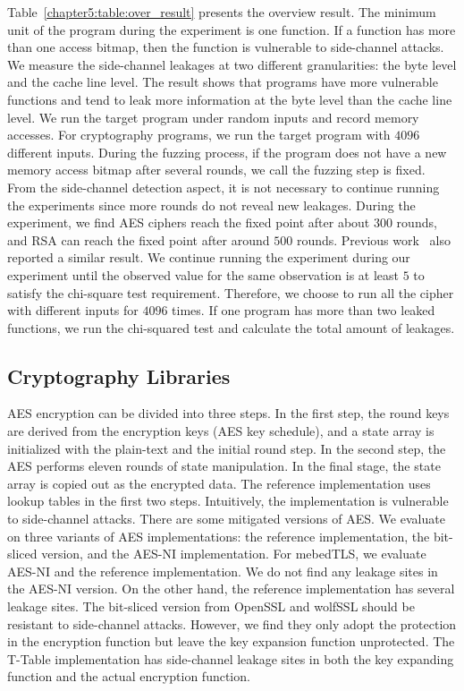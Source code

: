 Table~\ref{chapter5:table:over_result} presents the overview result. The minimum unit of the program during the experiment is one function. If a function has more than one access bitmap, then the function is vulnerable to side-channel attacks. We measure the side-channel leakages at two different granularities: the byte level and the cache line level. The result shows that programs have more vulnerable functions and tend to leak more information at the byte level than the cache line level. We run the target program under random inputs and record memory accesses. For cryptography programs, we run the target program with $4096$ different inputs. During the fuzzing process, if the program does not have a new memory access bitmap after several rounds, we call the fuzzing step is fixed. From the side-channel detection aspect, it is not necessary to continue running the experiments since more rounds do not reveal new leakages. During the experiment, we find AES ciphers reach the fixed point after about $300$ rounds, and RSA can reach the fixed point after around $500$ rounds. Previous work~\cite{217537} also reported a similar result. We continue running the experiment during our experiment until the observed value for the same observation is at least $5$ to satisfy the chi-square test requirement. Therefore, we choose to run all the cipher with different inputs for $4096$ times.  If one program has more than two leaked functions, we run the chi-squared test and calculate the total amount of leakages.




\subsection{Cryptography Libraries}
AES encryption can be divided into three steps. In the first step, the round keys are derived from the encryption keys (AES key schedule), and a state array is initialized with the plain-text and the initial round step. In the second step, the AES performs eleven rounds of state manipulation. In the final stage, the state array is copied out as the encrypted data.
The reference implementation uses lookup tables in the first two steps. Intuitively, the implementation is vulnerable to side-channel attacks. There are some mitigated versions of AES. We evaluate \ctool{} on three variants of AES implementations: the reference implementation, the bit-sliced version, and the AES-NI implementation.
For mebedTLS, we evaluate AES-NI and the reference implementation. We do not find any leakage sites in the AES-NI version. On the other hand, the reference implementation has several leakage sites. The bit-sliced version from OpenSSL and wolfSSL should be resistant to side-channel attacks. However, we find they only adopt the protection in the encryption function but leave the key expansion function unprotected. The T-Table implementation has side-channel leakage sites in both the key expanding function and the actual encryption function. 

